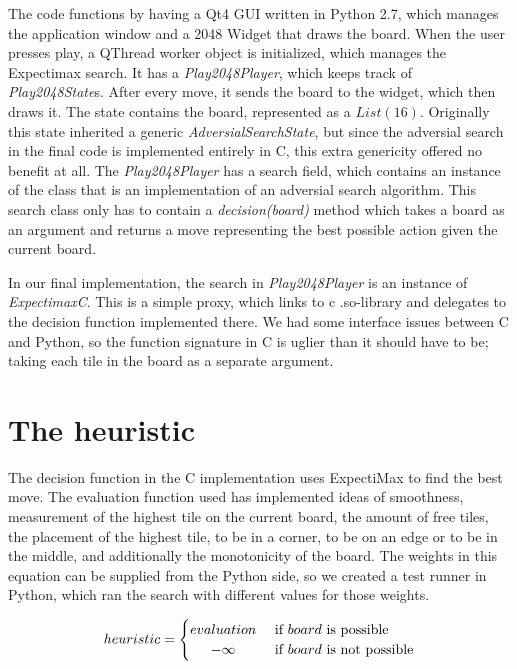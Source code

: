 The code functions by having a Qt4 GUI written in Python 2.7, which
manages the application window and a 2048 Widget that draws the board.
When the user presses play, a QThread worker object is initialized, which
manages the Expectimax search. It has a \emph{Play2048Player}, which keeps track of
\emph{Play2048State}s. After every move, it sends the board to the widget, which then draws it.
The state contains the board, represented as a \(List(16)\). Originally this
state inherited a generic \emph{AdversialSearchState}, but since the adversial
search in the final code is implemented entirely in C, this extra
genericity offered no benefit at all. The \emph{Play2048Player} has a search field, which
contains an instance of the class that is an implementation of an adversial search algorithm. This
search class only has to contain a \emph{decision(board)} method which takes a board
as an argument and returns a move representing the best possible action
given the current board.

In our final implementation, the search in \emph{Play2048Player} is an instance of
\emph{ExpectimaxC}. This is a simple proxy, which links to c .so-library and delegates
to the decision function implemented there. We had some interface issues between
C and Python, so the function signature in C is uglier than it should have to
be; taking each tile in the board as a separate argument.



\newpage
\section{The heuristic}

The decision function in the C implementation uses ExpectiMax to find the best move.
The evaluation function used has implemented ideas of smoothness, measurement of the highest tile
on the current board, the amount of free tiles, the placement of the highest tile,
to be in a corner, to be on an edge or to be in the middle, and additionally the monotonicity of the board.
The weights in this equation can be supplied from the Python side, so we created a test runner in Python, which ran the search with different values for those weights.

\[
 heuristic =
  \begin{cases}
      \hfill evaluation \hfill & \text{ if $board$ is possible} \\
      \hfill -\infty \hfill & \text{ if $board$ is not possible} \\
  \end{cases}
\]

